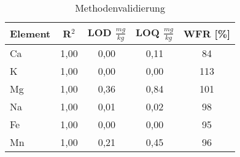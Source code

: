 \begin{table}[htbp]
  \centering
  \caption{Methodenvalidierung}
    \begin{tabular}{lcccc}
    \toprule
    Element & R$^2$ & LOD $\frac{mg}{kg}$ & LOQ $\frac{mg}{kg}$ & WFR [\%] \\
    \midrule
    Ca    & 1,00  & 0,00  & 0,11  & 84 \\
    K     & 1,00  & 0,00  & 0,00  & 113 \\
    Mg    & 1,00  & 0,36  & 0,84  & 101 \\
    Na    & 1,00  & 0,01  & 0,02  & 98 \\
    Fe    & 1,00  & 0,00  & 0,00  & 95 \\
    Mn    & 1,00  & 0,21  & 0,45  & 96 \\
    \bottomrule
    \end{tabular}%
  \label{tab:methodValidation}%
\end{table}%
